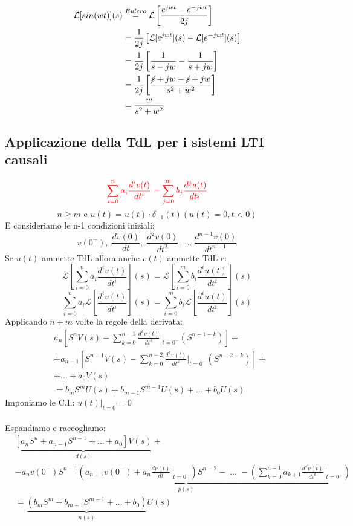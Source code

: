 \documentclass[a4paper]{article}
\begin{document}
\begin{align*}
    \mathcal{L}[sin(wt)](s) &\stackrel{Eulero}{=} \mathcal{L}\left[\frac{e^{jwt} - e^{-jwt}}{2j}\right]\\
    &= \frac{1}{2j}\left[\mathcal{L}[e^{jwt}](s) - \mathcal{L}[e^{-jwt}](s)\right] \\
    &= \frac{1}{2j}\left[\frac{1}{s-jw} - \frac{1}{s+jw}\right] \\
    &= \frac{1}{2j}\left[\frac{\cancel{s}+jw - \cancel{s}+jw}{s^2 + w^2}\right] \\
    &= \frac{w}{s^2 + w^2}
\end{align*}

\subsection{Applicazione della TdL per i sistemi LTI causali}
\begin{equation*}
    \color{red}
    \sum_{i=0}^{n} a_i \frac{d^iv(t)}{dt^i} = \sum_{j=0}^{m} b_j \frac{d^ju(t)}{dt^j}
\end{equation*}
\[n \ge m \text{ e } u(t) = u(t)\cdot \delta_{-1}(t) (u(t)=0, t<0)\]
E consideriamo le n-1 condizioni iniziali:
\[v(0^-), \; \frac{dv(0)}{dt}; \; \frac{d^2v(0)}{dt^2}; \; \dots \; \frac{d^{n-1}v(0)}{dt^{n-1}}\]
Se $u(t)$ ammette TdL allora anche $v(t)$ ammette TdL e:
\begin{equation*}
    \mathcal{L}\left[\sum_{i=0}^{n} a_i \frac{d^iv(t)}{dt^i}\right](s) = \mathcal{L}\left[\sum_{i=0}^{m} b_i \frac{d^iu(t)}{dt^i}\right](s)
\end{equation*}
\begin{equation*}
    \sum_{i=0}^{n} a_i \mathcal{L}\left[\frac{d^iv(t)}{dt^i}\right](s) = \sum_{i=0}^{m} b_i \mathcal{L}\left[\frac{d^iu(t)}{dt^i}\right](s)
\end{equation*}
Applicando $n+m$ volte la regole della derivata:\\
\begin{align*}
   &a_n\left[S^nV(s) - \sum_{k=0}^{n-1}\frac{d^kv(t)}{dt^k}\bigg|_{t=0^-}(S^{n-1-k})\right] + \\
   &+ a_{n-1}\left[S^{n-1}V(s) - \sum_{k=0}^{n-2}\frac{d^kv(t)}{dt^k}\bigg|_{t=0^-}(S^{n-2-k})\right] +\\
   &+ \dots + a_0V(s)\\
   &= b_mS^mU(s) + b_{m-1}S^{m-1}U(s) + \dots + b_0U(s)
\end{align*}
Imponiamo le C.I.: $u(t)\bigg|_{t=0} = 0$\\\\
Espandiamo e raccogliamo:
\begin{align*}
    &\underbrace{\left[a_nS^n + a_{n-1}S^{n-1} + \dots + a_0\right]V(s)}_{d(s)} +\\
    &- \underbrace{a_nv(0^-)S^{n-1}\left(a_{n-1}v(0^-) + a_n\frac{dv(t)}{dt}\bigg|_{t=0^-}\right)S^{n-2} - \; \dots \; - \left(\sum_{k=0}^{n-1} a_{k+1} \frac{d^kv(t)}{dt^k}\bigg|_{t=0^-}\right)}_{p(s)}\\
    &= \underbrace{(b_mS^m + b_{m-1}S^{m-1} + \dots + b_0)}_{n(s)}U(s)
\end{align*}
\end{document}
